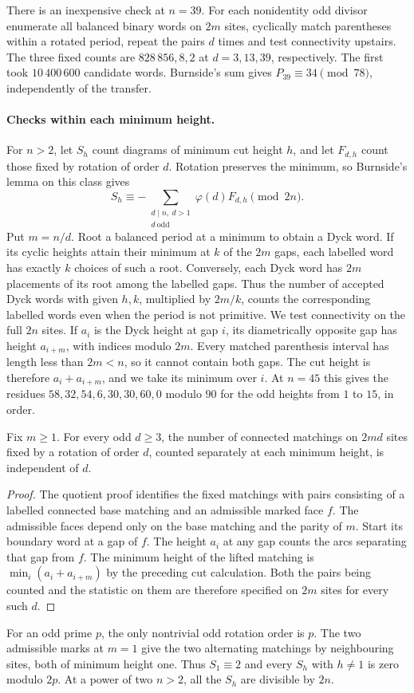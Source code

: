 There is an inexpensive check at \(n=39\). For each nonidentity odd divisor enumerate all balanced binary words on \(2m\) sites, cyclically match parentheses within a rotated period, repeat the pairs \(d\) times and test connectivity upstairs. The three fixed counts are \(828\,856,8,2\) at \(d=3,13,39\), respectively. The first took \(10\,400\,600\) candidate words. Burnside's sum gives \(P_{39}\equiv34\pmod {78}\), independently of the transfer.

\paragraph{Checks within each minimum height.}
For \(n>2\), let \(S_h\) count diagrams of minimum cut height \(h\), and let
\(F_{d,h}\) count those fixed by rotation of order \(d\). Rotation preserves
the minimum, so Burnside's lemma on this class gives
\[
 S_h\equiv-\sum_{\substack{d\mid n,\ d>1\\d\ \mathrm{odd}}}
                 \varphi(d)F_{d,h}\pmod{2n}.
\]
Put \(m=n/d\). Root a balanced period at a minimum to obtain a Dyck word.
If its cyclic heights attain their minimum at \(k\) of the \(2m\) gaps,
each labelled word has exactly \(k\) choices of such a root. Conversely,
each Dyck word has \(2m\) placements of its root among the labelled gaps.
Thus the number of accepted Dyck words with given \(h,k\), multiplied by
\(2m/k\), counts the corresponding labelled words even when the period
is not primitive. We test connectivity on the full \(2n\) sites.
If \(a_i\) is the Dyck height at gap \(i\), its diametrically opposite
gap has height \(a_{i+m}\), with indices modulo \(2m\). Every matched
parenthesis interval has length less than \(2m<n\), so it cannot
contain both gaps. The cut height is therefore \(a_i+a_{i+m}\), and we
take its minimum over \(i\). At \(n=45\) this gives the residues
\(58,32,54,6,30,30,60,0\) modulo \(90\) for the odd heights from
\(1\) to \(15\), in order.

\begin{corollary}
Fix \(m\ge1\). For every odd \(d\ge3\), the number of connected
matchings on \(2md\) sites fixed by a rotation of order \(d\), counted
separately at each minimum height, is independent of \(d\).
\end{corollary}
\begin{proof}
The quotient proof identifies the fixed matchings with pairs consisting
of a labelled connected base matching and an admissible marked face
\(f\). The admissible faces depend only on the base matching and the
parity of \(m\). Start its boundary word at a gap of \(f\). The height
\(a_i\) at any gap counts the arcs separating that gap from \(f\).
The minimum height of the lifted matching is
\(\min_i(a_i+a_{i+m})\) by the preceding cut calculation. Both the
pairs being counted and the statistic on them are therefore specified
on \(2m\) sites for every such \(d\).
\end{proof}
For an odd prime \(p\), the only nontrivial odd rotation order is \(p\).
The two admissible marks at \(m=1\) give the two alternating matchings
by neighbouring sites, both of minimum height one. Thus \(S_1\equiv2\)
and every \(S_h\) with \(h\ne1\) is zero modulo \(2p\). At a power of
two \(n>2\), all the \(S_h\) are divisible by \(2n\).

